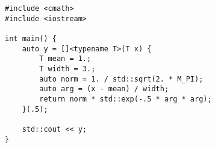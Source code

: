 \begin{lstlisting}[title=\href{https://godbolt.org/z/NC6DKj}{\texttt{godbolt.org/z/NC6DKj}}]
#include <cmath>
#include <iostream>

int main() {
    auto y = []<typename T>(T x) {
        T mean = 1.;
        T width = 3.;
        auto norm = 1. / std::sqrt(2. * M_PI);
        auto arg = (x - mean) / width;
        return norm * std::exp(-.5 * arg * arg);
    }(.5);

    std::cout << y;
}
\end{lstlisting}
